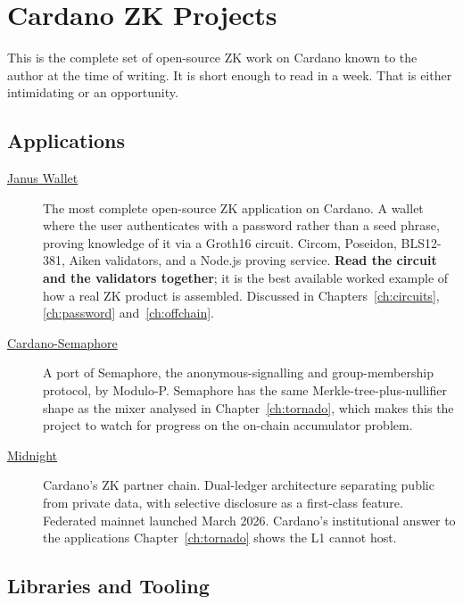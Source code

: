\section{Cardano ZK Projects} \label{sec:sito-cardano-zk}

This is the complete set of open-source ZK work on Cardano known to the author
at the time of writing. It is short enough to read in a week. That is either
intimidating or an opportunity.

\subsection*{Applications}

\begin{description}
  \item[\href{https://github.com/leobel/janus-wallet}{Janus Wallet}]
    The most complete open-source ZK application on Cardano. A wallet where
    the user authenticates with a password rather than a seed phrase, proving
    knowledge of it via a Groth16 circuit. Circom, Poseidon, BLS12-381, Aiken
    validators, and a Node.js proving service. \textbf{Read the circuit and
    the validators together}; it is the best available worked example of how a
    real ZK product is assembled. Discussed in
    Chapters~\ref{ch:circuits}, \ref{ch:password} and~\ref{ch:offchain}.

  \item[\href{https://github.com/Modulo-P/Cardano-Semaphore}{Cardano-Semaphore}]
    A port of Semaphore, the anonymous-signalling and group-membership
    protocol, by Modulo-P. Semaphore has the same Merkle-tree-plus-nullifier
    shape as the mixer analysed in Chapter~\ref{ch:tornado}, which makes this
    the project to watch for progress on the on-chain accumulator problem.

  \item[\href{https://midnight.network/}{Midnight}]
    Cardano's ZK partner chain. Dual-ledger architecture separating public
    from private data, with selective disclosure as a first-class feature.
    Federated mainnet launched March 2026. Cardano's institutional answer to
    the applications Chapter~\ref{ch:tornado} shows the L1 cannot host.
\end{description}

\subsection*{Libraries and Tooling}

